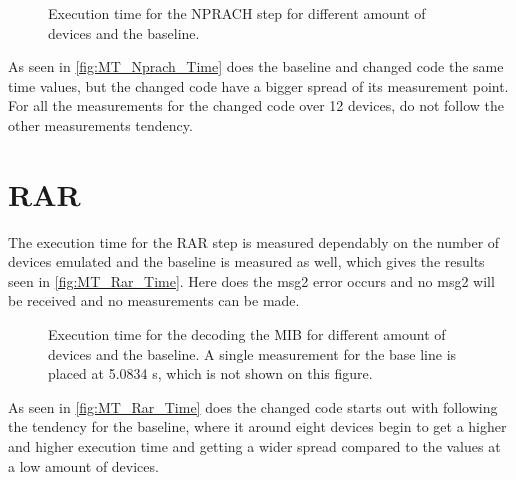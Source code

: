 \begin{figure}[H]
\centering
\resizebox{0.5\textwidth}{!}{
}
\caption{Execution time for the NPRACH step for different amount of devices and the baseline.}
\label{fig:MT_Nprach_Time}
\end{figure}

As seen in \autoref{fig:MT_Nprach_Time} does the baseline and changed code the same time values, but the changed code have a bigger spread of its measurement point. For all the measurements for the changed code over 12 devices, do not follow the other measurements tendency.

\section{RAR}
The execution time for the RAR step is measured dependably on the number of devices emulated and the baseline is measured as well, which gives the results seen in \autoref{fig:MT_Rar_Time}. Here does the msg2 error occurs and no msg2 will be received and no measurements can be made.

\begin{figure}[H]
\centering
\resizebox{0.5\textwidth}{!}{
}
\caption{Execution time for the decoding the MIB for different amount of devices and the baseline. A single measurement for the base line is placed at 5.0834 s, which is not shown on this figure.}
\label{fig:MT_Rar_Time}
\end{figure}

As seen in \autoref{fig:MT_Rar_Time} does the changed code starts out with following the tendency for the baseline, where it around eight devices begin to get a higher and higher execution time and getting a wider spread compared to the values at a low amount of devices.